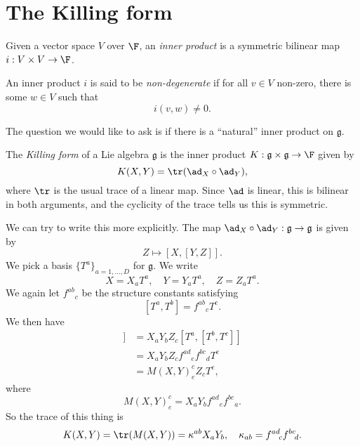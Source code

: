 \documentclass[a4paper]{article}
\begin{document}
\section{The Killing form}
\begin{defi}
  Given a vector space $V$ over $\F$, an \emph{inner product} is a symmetric bilinear map $i: V \times V \to \F$.
\end{defi}

\begin{defi}
  An inner product $i$ is said to be \emph{non-degenerate} if for all $v \in V$ non-zero, there is some $w \in V$ such that
  \[
    i(v, w) \not= 0.
  \]
\end{defi}

The question we would like to ask is if there is a ``natural'' inner product on $\mathfrak{g}$.

\begin{defi}
  The \emph{Killing form} of a Lie algebra $\mathfrak{g}$ is the inner product $K: \mathfrak{g} \times \mathfrak{g} \to \F$ given by
  \[
    K(X, Y) = \tr(\ad_X \circ \ad_Y),
  \]
  where $\tr$ is the usual trace of a linear map. Since $\ad$ is linear, this is bilinear in both arguments, and the cyclicity of the trace tells us this is symmetric.
\end{defi}

We can try to write this more explicitly. The map $\ad_X \circ \ad_Y: \mathfrak{g} \to \mathfrak{g}$ is given by
\[
  Z \mapsto [X, [Y, Z]].
\]
We pick a basis $\{T^a\}_{a = 1, \ldots, D}$ for $\mathfrak{g}$. We write
\[
  X = X_aT^a,\quad Y = Y_aT^a,\quad Z = Z_aT^a.
\]
We again let $f^{ab}\!_c$ be the structure constants satisfying
\[
  [T^a, T^b] = f^{ab}\!_c T^c.
\]
We then have
\begin{align*}
  [X, [Y, Z]] &= X_a Y_b Z_ c [T^a, [T^b, T^c]]\\
  &= X_a Y_b Z_c f^{ad}\!_e f^{bc}\!_d T^e\\
  &= M(X, Y)^c_e Z_c T^e,
\end{align*}
where
\[
  M(X, Y)^c_e = X_a Y_b f^{ad}\!_e f^{bc}\!_a.
\]
So the trace of this thing is
\[
  K(X, Y) = \tr(M(X, Y)) = \kappa^{ab}X_a Y_b,\quad \kappa_{ab} = f^{ad}\!_c f^{bc}\!_d.
\]

\printindex
\end{document}
